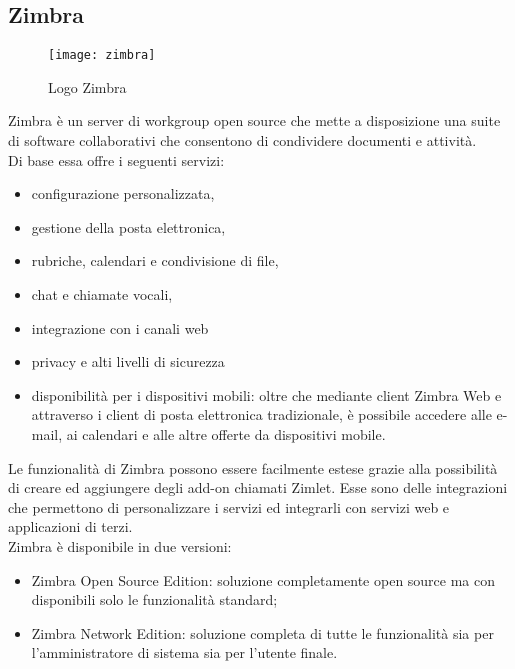 \subsection{Zimbra} \label{subsec:Zimbra}
\begin{figure}[H] 
	\centering
	\texttt{[image: zimbra]}
	\caption{Logo Zimbra}
	\label{fig:logoZimbra}
\end{figure}
Zimbra è un server di workgroup open source che mette a disposizione una suite di software collaborativi che consentono di condividere documenti e attività. \\
Di base essa offre i seguenti servizi:
\begin{itemize}
	\item configurazione personalizzata,
	\item gestione della posta elettronica,
	\item rubriche, calendari e condivisione di file,
	\item chat e chiamate vocali,
	\item integrazione con i canali web
	\item privacy e alti livelli di sicurezza
	\item disponibilità per i dispositivi mobili: oltre che mediante client Zimbra Web e attraverso i client di posta elettronica tradizionale, è possibile accedere alle e-mail, ai calendari e alle altre offerte da dispositivi mobile. 
\end{itemize}
Le funzionalità di Zimbra possono essere facilmente estese grazie alla possibilità di creare ed aggiungere degli add-on chiamati Zimlet. Esse sono delle integrazioni che permettono di personalizzare i servizi ed integrarli con servizi web e applicazioni di terzi.\\
Zimbra è disponibile in due versioni: 
\begin{itemize}
	\item Zimbra Open Source Edition: soluzione completamente open source ma con disponibili solo le funzionalità standard;
	\item Zimbra Network Edition: soluzione completa di tutte le funzionalità sia per l'amministratore di sistema sia per l'utente finale.
\end{itemize}


